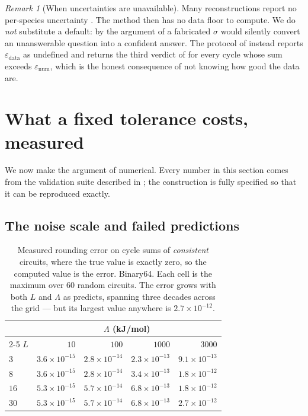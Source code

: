 \documentclass[11pt,twocolumn,a4paper]{article}
\theoremstyle{pstyle}
\theoremstyle{definition}
\theoremstyle{remark}
\newtheorem{remark}[theorem]{Remark}
\newcommand{\eps}{\varepsilon}
\newcommand{\epsnum}{\eps_{\mathrm{num}}}
\newcommand{\epsdata}{\eps_{\mathrm{data}}}
\begin{document}
\begin{remark}[When uncertainties are unavailable]
\label{rem:no-sigma}
Many reconstructions report no per-species uncertainty
\citep{brunk2018,orth2010}. The method then has no data floor to
compute. We do \emph{not} substitute a default: by the argument of
 a fabricated $\sigma$ would silently convert an
unanswerable question into a confident answer. The protocol of
 instead reports $\epsdata$ as undefined and returns
the third verdict of  for every cycle whose sum
exceeds $\epsnum$, which is the honest consequence of not knowing how
good the data are.
\end{remark}

\section{What a fixed tolerance costs, measured}
\label{sec:fixed-tolerance-fails}

We now make the argument of  numerical. Every number in
this section comes from the validation suite described in
; the construction is fully specified so that it
can be reproduced exactly.

\subsection{The noise scale and failed predictions}

\begin{table}[t]
\centering\small
\caption{Measured rounding error on cycle sums of \emph{consistent}
circuits, where the true value is exactly zero, so the computed value is
the error. Binary64. Each cell is the maximum over $60$ random circuits.
The error grows with both $L$ and $\Lambda$ as 
predicts, spanning three decades across the grid --- but its largest
value anywhere is $2.7\times10^{-12}$.}
\label{tab:v1}
\begin{tabular}{@{}lrrrr@{}}
\toprule
& \multicolumn{4}{c}{$\Lambda$ (kJ/mol)}\\
\cmidrule(l){2-5}
$L$ & $10$ & $100$ & $1000$ & $3000$\\
\midrule
$3$  & $3.6\times10^{-15}$ & $2.8\times10^{-14}$ & $2.3\times10^{-13}$ & $9.1\times10^{-13}$\\
$8$  & $3.6\times10^{-15}$ & $2.8\times10^{-14}$ & $3.4\times10^{-13}$ & $1.8\times10^{-12}$\\
$16$ & $5.3\times10^{-15}$ & $5.7\times10^{-14}$ & $6.8\times10^{-13}$ & $1.8\times10^{-12}$\\
$30$ & $5.3\times10^{-15}$ & $5.7\times10^{-14}$ & $6.8\times10^{-13}$ & $2.7\times10^{-12}$\\
\bottomrule
\end{tabular}
\end{table}
\end{document}
